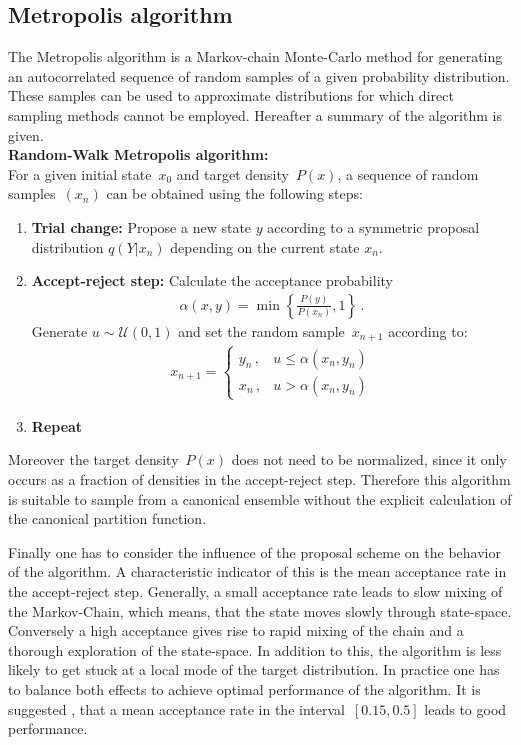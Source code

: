 \documentclass[11pt, a4paper]{article}
\numberwithin{equation}{section}
\begin{document}
\subsection{Metropolis algorithm} \label{sec:Metropolis}
The Metropolis algorithm is a Markov-chain Monte-Carlo method for generating an autocorrelated sequence of random samples of a given probability distribution.
These samples can be used to approximate distributions for which direct sampling methods cannot be employed.
Hereafter a summary of the algorithm is given.\\

\noindent\textbf{Random-Walk Metropolis algorithm:}\\
For a given initial state~$x_0$ and target density~$P(x)$, a sequence of random samples~$\left( x_n \right)$ can be obtained using the following steps:
\begin{enumerate}
	\item \textbf{Trial change:}
		Propose a new state $y$ according to a symmetric proposal distribution $q(Y|x_n)$ depending on the current state $x_n$.
		
	\item \textbf{Accept-reject step:}
		Calculate the acceptance probability
		\begin{align}
			\alpha(x, y) = \min\left\{ \frac{P(y)}{P(x_n)}, 1\right\} \,\text{.}
			\label{eq:acceptance_probability}
		\end{align}
		Generate $u \sim \mathcal{U}(0, 1)$ and set the random sample~$x_{n+1}$ according to:
		\begin{align*}
			x_{n+1} = \begin{cases}
					y_n \,, & u \leq \alpha(x_n, y_n) \\
					x_n \,, & u > \alpha(x_n, y_n)
				\end{cases}
		\end{align*}
		
	\item \textbf{Repeat}
\end{enumerate}
Moreover the target density~$P(x)$ does not need to be normalized, since it only occurs as a fraction of densities in the accept-reject step.
Therefore this algorithm is suitable to sample from a canonical ensemble without the explicit calculation of the canonical partition function.

Finally one has to consider the influence of the proposal scheme on the behavior of the algorithm.
A characteristic indicator of this is the mean acceptance rate in the accept-reject step.
Generally, a small acceptance rate leads to slow mixing of the Markov-Chain, which means, that the state moves slowly through state-space.
Conversely a high acceptance gives rise to rapid mixing of the chain and a thorough exploration of the state-space.
In addition to this, the algorithm is less likely to get stuck at a local mode of the target distribution.
In practice one has to balance both effects to achieve optimal performance of the algorithm.
It is suggested \cite{gilks_richardson}, that a mean acceptance rate in the interval~$[0.15, 0.5]$ leads to good performance.
\end{document}
